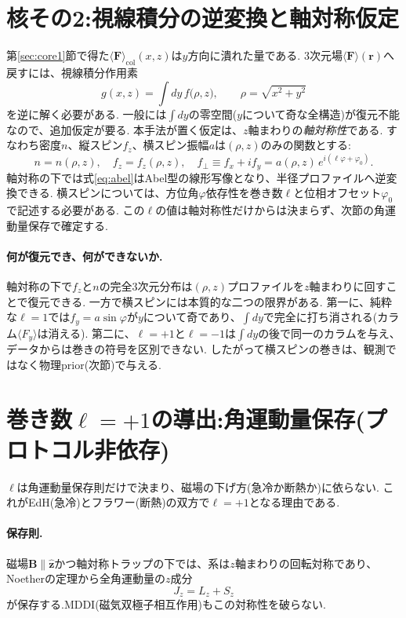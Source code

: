 \documentclass[11pt]{ltjsarticle}
\newcommand{\Fv}{\bm{F}}
\newcommand{\rv}{\bm{r}}
\newcommand{\expv}[1]{\langle #1 \rangle}
\begin{document}
\section{核その2:視線積分の逆変換と軸対称仮定}
\label{sec:core2}

第\ref{sec:core1}節で得た$\expv{\Fv}_{\mathrm{col}}(x,z)$は$y$方向に潰れた量である.
3次元場$\expv{\Fv}(\rv)$へ戻すには、視線積分作用素
\begin{equation}
  g(x,z)=\int dy\,f\bigl(\rho,z\bigr),\qquad \rho=\sqrt{x^2+y^2}
  \label{eq:abel}
\end{equation}
を逆に解く必要がある.
一般には$\int dy$の零空間($y$について奇な全構造)が復元不能なので、追加仮定が要る.
本手法が置く仮定は、$z$軸まわりの\emph{軸対称性}である.
すなわち密度$n$、縦スピン$f_z$、横スピン振幅$a$は$(\rho,z)$のみの関数とする:
\begin{equation}
  n=n(\rho,z),\quad f_z=f_z(\rho,z),\quad
  f_\perp\equiv f_x+if_y=a(\rho,z)\,e^{i(\ell\varphi+\varphi_0)}.
  \label{eq:axisym}
\end{equation}
軸対称の下では式\eqref{eq:abel}はAbel型の線形写像となり、半径プロファイルへ逆変換できる.
横スピンについては、方位角$\varphi$依存性を巻き数$\ell$と位相オフセット$\varphi_0$で記述する必要がある.
この$\ell$の値は軸対称性だけからは決まらず、次節の角運動量保存で確定する.

\paragraph{何が復元でき、何ができないか.}
軸対称の下で$f_z$と$n$の完全3次元分布は$(\rho,z)$プロファイルを$z$軸まわりに回すことで復元できる.
一方で横スピンには本質的な二つの限界がある.
第一に、純粋な$\ell=1$では$f_y=a\sin\varphi$が$y$について奇であり、$\int dy$で完全に打ち消される(カラム$\expv{F_y}$は消える).
第二に、$\ell=+1$と$\ell=-1$は$\int dy$の後で同一のカラムを与え、データからは巻きの符号を区別できない.
したがって横スピンの巻きは、観測ではなく物理prior(次節)で与える.

\section{巻き数$\ell=+1$の導出:角運動量保存(プロトコル非依存)}
\label{sec:ell}

$\ell$は角運動量保存則だけで決まり、磁場の下げ方(急冷か断熱か)に依らない.
これがEdH(急冷)とフラワー(断熱)の双方で$\ell=+1$となる理由である.

\paragraph{保存則.}
磁場$\bm B\parallel\hat{\bm z}$かつ軸対称トラップの下では、系は$z$軸まわりの回転対称であり、
Noetherの定理から全角運動量の$z$成分
\begin{equation}
  J_z=L_z+S_z
\end{equation}
が保存する.MDDI(磁気双極子相互作用)もこの対称性を破らない.
\end{document}
